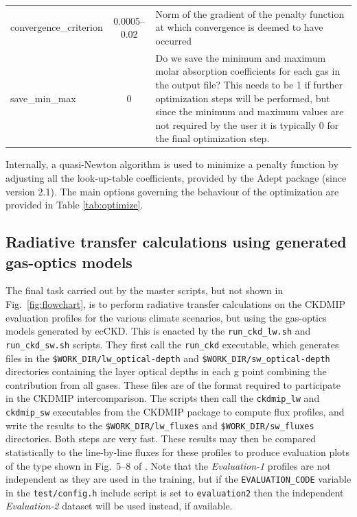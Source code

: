 \documentclass[a4,oneside]{article}
\def\codesize{\small}
\newcommand{\ecckd}{ecCKD}
\def\codesize{\small}
\def\code#1{{\codesize\texttt{#1}}}
\begin{document}
\begin{table}[tb!]
\begin{center}
\begin{tabular}{lc>{\raggedright\arraybackslash}p{9cm}}
convergence\_criterion & 0.0005--0.02 & Norm of the gradient of the penalty function at which convergence is deemed to have occurred \\
save\_min\_max & 0 & Do we save the minimum and maximum molar absorption coefficients for each gas in the output file?  This needs to be 1 if further optimization steps will be performed, but since the minimum and maximum values are not required by the user it is typically 0 for the final optimization step.\\
\hline
\end{tabular}
\end{center}
\end{table}

Internally, a quasi-Newton algorithm is used to minimize a penalty
function by adjusting all the look-up-table coefficients, provided by
the Adept package (since version 2.1). The main options governing the
behaviour of the optimization are provided in Table
\ref{tab:optimize}.

\subsection{Radiative transfer calculations using generated gas-optics models}
\label{sec:rt}
The final task carried out by the master scripts, but not shown in
Fig.\ \ref{fig:flowchart}, is to perform radiative transfer
calculations on the CKDMIP evaluation profiles for the various climate
scenarios, but using the gas-optics models generated by \ecckd. This
is enacted by the \code{run\_ckd\_lw.sh} and \code{run\_ckd\_sw.sh}
scripts. They first call the \code{run\_ckd} executable, which
generates files in the \code{\$WORK\_DIR/lw\_optical-depth} and
\code{\$WORK\_DIR/sw\_optical-depth} directories containing the layer
optical depths in each g point combining the contribution from all
gases.  These files are of the format required to participate in the
CKDMIP intercomparison. The scripts then call the \code{ckdmip\_lw}
and \code{ckdmip\_sw} executables from the CKDMIP package to compute
flux profiles, and write the results to the
\code{\$WORK\_DIR/lw\_fluxes} and \code{\$WORK\_DIR/sw\_fluxes}
directories. Both steps are very fast. These results may then be
compared statistically to the line-by-line fluxes for these profiles
to produce evaluation plots of the type shown in Fig.\ 5--8 of
\cite{Hogan&2020}.  Note that the \emph{Evaluation-1} profiles are not
independent as they are used in the training, but if the
\code{EVALUATION\_CODE} variable in the \code{test/config.h} include
script is set to \code{evaluation2} then the independent
\emph{Evaluation-2} dataset will be used instead, if available.
\end{document}
